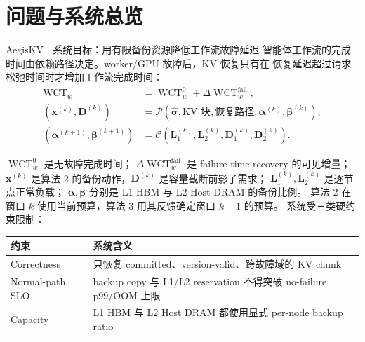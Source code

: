 \section{问题与系统总览}

\begin{frame}{AegisKV | 系统目标：用有限备份资源降低工作流故障延迟}
  \small
  智能体工作流的完成时间由依赖路径决定。worker/GPU 故障后，KV 恢复只有在
  恢复延迟超过请求松弛时间时才增加工作流完成时间：
  \begin{equation}
    \begin{aligned}
      \operatorname{WCT}_w
      &=\operatorname{WCT}_w^{0}
        +\Delta\operatorname{WCT}_w^{\mathrm{fail}},\\
      (\mathbf x^{(k)},\mathbf D^{(k)})
      &=\mathcal P(
        \widehat{\boldsymbol\sigma},\text{KV 块},\text{恢复路径};
        \boldsymbol\alpha^{(k)},\boldsymbol\beta^{(k)}),\\
      (\boldsymbol\alpha^{(k+1)},\boldsymbol\beta^{(k+1)})
      &=\mathcal C(
        \mathbf L_1^{(k)},\mathbf L_2^{(k)},
        \mathbf D_1^{(k)},\mathbf D_2^{(k)}).
    \end{aligned}
    \label{eq:system-objective}
  \end{equation}

  \scriptsize
  $\operatorname{WCT}_w^{0}$ 是无故障完成时间；
  $\Delta\operatorname{WCT}_w^{\mathrm{fail}}$ 是 failure-time recovery 的可见增量；
  $\mathbf x^{(k)}$ 是算法 2 的备份动作，$\mathbf D^{(k)}$ 是容量截断前影子需求；
  $\mathbf L_1^{(k)},\mathbf L_2^{(k)}$ 是逐节点正常负载；
  $\boldsymbol\alpha,\boldsymbol\beta$ 分别是 L1 HBM 与 L2 Host DRAM 的备份比例。
  算法 2 在窗口 $k$ 使用当前预算，算法 3 用其反馈确定窗口 $k+1$ 的预算。
  系统受三类硬约束限制：

  \vspace{0.07cm}
  \renewcommand{\arraystretch}{1.17}
  \begin{tabularx}{\textwidth}{p{}X}
    \toprule
    约束 & 系统含义 \\
    \midrule
    Correctness & 只恢复 committed、version-valid、跨故障域的 KV chunk \\
    Normal-path SLO & backup copy 与 L1/L2 reservation 不得突破 no-failure p99/OOM 上限 \\
    Capacity & L1 HBM 与 L2 Host DRAM 都使用显式 per-node backup ratio \\
    \bottomrule
  \end{tabularx}

  \vspace{0.08cm}
\end{frame}

